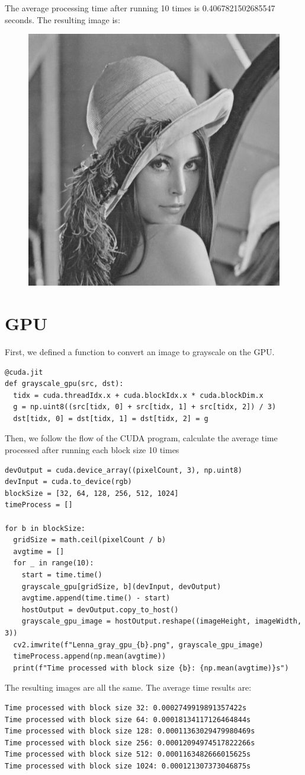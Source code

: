 \documentclass{article}
\begin{document}
The average processing time after running 10 times is 0.4067821502685547 seconds. The resulting image is:
\begin{figure}[h]
    \centering
    \includegraphics[width=0.5\linewidth]{Lenna_gray_cpu.png}
\end{figure}

\section{GPU}
First, we defined a function to convert an image to grayscale on the GPU. 
\begin{lstlisting}
@cuda.jit
def grayscale_gpu(src, dst):
  tidx = cuda.threadIdx.x + cuda.blockIdx.x * cuda.blockDim.x
  g = np.uint8((src[tidx, 0] + src[tidx, 1] + src[tidx, 2]) / 3)
  dst[tidx, 0] = dst[tidx, 1] = dst[tidx, 2] = g
\end{lstlisting}

Then, we follow the flow of the CUDA program, calculate the average time processed after running each block size 10 times
\begin{lstlisting}
devOutput = cuda.device_array((pixelCount, 3), np.uint8)
devInput = cuda.to_device(rgb)
blockSize = [32, 64, 128, 256, 512, 1024]
timeProcess = []

for b in blockSize:
  gridSize = math.ceil(pixelCount / b)
  avgtime = []
  for _ in range(10):
    start = time.time()
    grayscale_gpu[gridSize, b](devInput, devOutput)
    avgtime.append(time.time() - start)
    hostOutput = devOutput.copy_to_host()
    grayscale_gpu_image = hostOutput.reshape((imageHeight, imageWidth, 3))
  cv2.imwrite(f"Lenna_gray_gpu_{b}.png", grayscale_gpu_image)
  timeProcess.append(np.mean(avgtime))
  print(f"Time processed with block size {b}: {np.mean(avgtime)}s")
\end{lstlisting}

The resulting images are all the same. The average time results are:
\begin{lstlisting}
Time processed with block size 32: 0.0002749919891357422s
Time processed with block size 64: 0.00018134117126464844s
Time processed with block size 128: 0.00011363029479980469s
Time processed with block size 256: 0.00012094974517822266s
Time processed with block size 512: 0.0001163482666015625s
Time processed with block size 1024: 0.000121307373046875s
\end{lstlisting}
\end{document}
